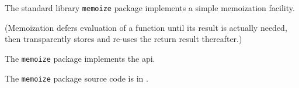 
The standard library {\tt memoize} package implements a simple memoization facility.

(Memoization defers evaluation of a function until its result is actually needed,
then transparently stores and re-uses the return result thereafter.)

The {\tt memoize} package implements the  api.

The {\tt memoize} package source code is in .


